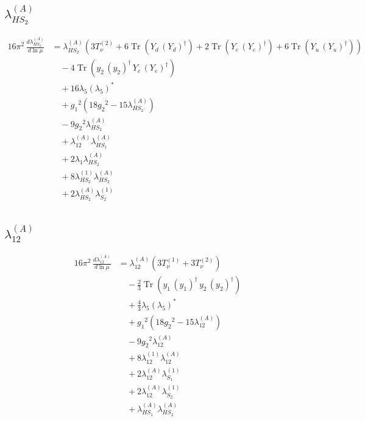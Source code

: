 \documentclass[10pt,a4paper]{article}
\begin{document}
\subsection*{$\lambda_{HS_2}^{(A)}$}
\begin{align*}
16\pi^2\,\frac{d \lambda_{HS_2}^{(A)}}{d\ln\mu} &={\lambda_{HS_2}^{(A)}} (3 T_{\nu}^{(2)}+6 \operatorname{Tr}\!\left({Y_d}\,\left({Y_d}\right)^{\dagger}\right)+2 \operatorname{Tr}\!\left({Y_e}\,\left({Y_e}\right)^{\dagger}\right)+6 \operatorname{Tr}\!\left({Y_u}\,\left({Y_u}\right)^{\dagger}\right)) \\
&\quad -4 \operatorname{Tr}\!\left({y_2}\,\left({y_2}\right)^{\dagger}\,{Y_e}\,\left({Y_e}\right)^{\dagger}\right) \\
&\quad +16 {\lambda_5} \left({\lambda_5}\right)^{*} \\
&\quad +{g_1}^2 \left(18 {g_2}^2-15 {\lambda_{HS_2}^{(A)}}\right) \\
&\quad -9 {g_2}^2 {\lambda_{HS_2}^{(A)}} \\
&\quad +{\lambda_{12}^{(A)}} {\lambda_{HS_1}^{(A)}} \\
&\quad +2 {\lambda_1} {\lambda_{HS_2}^{(A)}} \\
&\quad +8 {\lambda_{HS_2}^{(1)}} {\lambda_{HS_2}^{(A)}} \\
&\quad +2 {\lambda_{HS_2}^{(A)}} {\lambda_{S_2}^{(1)}} \\
\end{align*}
\subsection*{$\lambda_{12}^{(A)}$}
\begin{align*}
16\pi^2\,\frac{d \lambda_{12}^{(A)}}{d\ln\mu} &={\lambda_{12}^{(A)}} (3 T_{\nu}^{(1)}+3 T_{\nu}^{(2)}) \\
&\quad -\frac{2}{3} \operatorname{Tr}\!\left({y_1}\,\left({y_1}\right)^{\dagger}\,{y_2}\,\left({y_2}\right)^{\dagger}\right) \\
&\quad +\frac{4}{3} {\lambda_5} \left({\lambda_5}\right)^{*} \\
&\quad +{g_1}^2 \left(18 {g_2}^2-15 {\lambda_{12}^{(A)}}\right) \\
&\quad -9 {g_2}^2 {\lambda_{12}^{(A)}} \\
&\quad +8 {\lambda_{12}^{(1)}} {\lambda_{12}^{(A)}} \\
&\quad +2 {\lambda_{12}^{(A)}} {\lambda_{S_1}^{(1)}} \\
&\quad +2 {\lambda_{12}^{(A)}} {\lambda_{S_2}^{(1)}} \\
&\quad +{\lambda_{HS_1}^{(A)}} {\lambda_{HS_2}^{(A)}} \\
\end{align*}
\end{document}
